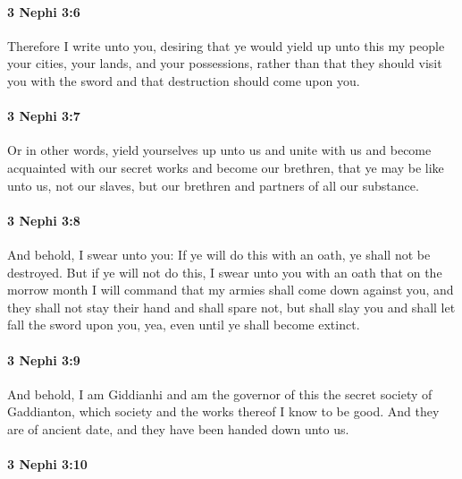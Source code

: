 		\paragraph{3 Nephi 3:6} %
			\label{3NEPHI-3-6}

			Therefore I write unto you,
			desiring that ye would yield up unto this my people
			your cities, your lands, and your possessions,
			rather than that they should visit you with the sword
			and that destruction should come upon you.

		\paragraph{3 Nephi 3:7} %
			\label{3NEPHI-3-7}

			Or in other words, yield yourselves up unto us and unite with us
			and become acquainted with our secret works and become our brethren,
			that ye may be like unto us, not our slaves,
			but our brethren and partners of all our substance.

		\paragraph{3 Nephi 3:8} %
			\label{3NEPHI-3-8}

			And behold, I swear unto you:
			If ye will do this with an oath, ye shall not be destroyed.
			But if ye will not do this, I swear unto you with an oath
			that on the morrow month I will command
			that my armies shall come down against you,
			and they shall not stay their hand and shall spare not,
			but shall slay you and shall let fall the sword upon you,
			yea, even until ye shall become extinct.

		\paragraph{3 Nephi 3:9} %
			\label{3NEPHI-3-9}

			And behold, I am Giddianhi
			and am the governor of this the secret society of Gaddianton,
			which society and the works thereof I know to be good.
			And they are of ancient date,
			and they have been handed down unto us.

		\paragraph{3 Nephi 3:10} %
			\label{3NEPHI-3-10}

